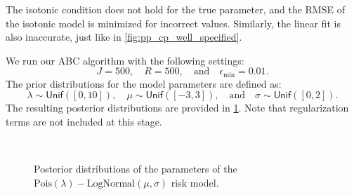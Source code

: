 \documentclass[10pt]{article}
\newcommand*{\UnifDist}{\mathsf{Unif}}
\begin{document}
The isotonic condition does not hold for the true parameter, and the RMSE of the isotonic model is minimized for incorrect values. Similarly, the linear fit is also inaccurate, just like in \cref{fig:pp_cp_well_specified}. 

We run our ABC algorithm with the following settings:  
$$
J = 500, \quad R = 500, \quad \text{and} \quad \epsilon_{\min} = 0.01.
$$
The prior distributions for the model parameters are defined as:  
$$
\lambda \sim \UnifDist([0, 10]), \quad \mu \sim \UnifDist([-3, 3]), \quad \text{and} \quad \sigma \sim \UnifDist([0, 2]).
$$
The resulting posterior distributions are provided in \cref{fig:posterior_commercial_premium_wo_reg_miss}. Note that regularization terms are not included at this stage.


\begin{figure}[!ht]
  \begin{center}
    \\
    \caption{Posterior distributions of the parameters of the $\text{Pois}(\lambda)-\text{LogNormal}(\mu , \sigma)$ risk model.}
    \label{fig:posterior_commercial_premium_wo_reg_miss}
  \end{center}
\end{figure}
\end{document}
